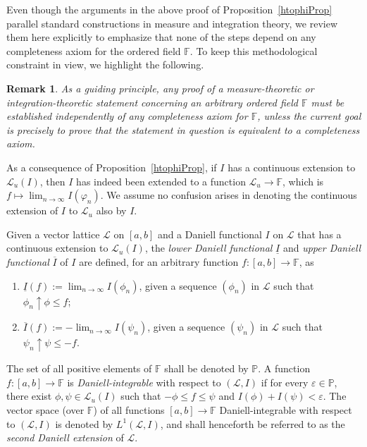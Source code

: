 \documentclass[11pt,a4paper]{article}
\newtheorem{remark}[theorem]{Remark}
\def\F{\mathbb{F}}
\def\P{\mathbb{P}}
\def\lbrak{\left[}
\def\rbrak{\right]}
\def\abClosed{\lbrak a,b\rbrak}
\def\stepLatt{\mathcal{L}}
\def\istepLatt{\stepLatt_u}
\def\into{\longrightarrow}
\def\nseqlim{{\displaystyle\lim_{n\rightarrow\infty}}}
\begin{document}
Even though the arguments in the above proof of Proposition~\ref{htophiProp} parallel standard constructions in measure and integration theory, we review them here explicitly to emphasize that none of the steps depend on any completeness axiom for the ordered field $\F$. To keep this methodological constraint in view, we highlight the following.

\begin{remark}\label{heuRem}
As a guiding principle, any proof of a measure-theoretic or integration-theoretic statement concerning an arbitrary ordered field $\F$ must be established independently of any completeness axiom for $\F$, unless the current goal is precisely to prove that the statement in question is equivalent to a completeness axiom.
\end{remark}

As a consequence of Proposition~\ref{htophiProp}, if $I$ has a continuous extension to $\istepLatt(I)$, then $I$ has indeed been extended to a function $\istepLatt\into\F$, which is $f\mapsto\nseqlim I(\varphi_n)$. We assume no confusion arises in denoting the continuous extension of $I$ to $\istepLatt$ also by $I$.


Given a vector lattice $\stepLatt$ on $\abClosed$ and a Daniell functional $I$ on $\stepLatt$ that has a continuous extension to $\istepLatt(I)$, the \emph{lower Daniell functional} $\underline{I}$ and \emph{upper Daniell functional} $\overline{I}$ of $I$ are defined, for an arbitrary function $f:\abClosed\into\F$, as
\begin{enumerate}
    \item $\underline{I}(f) := \nseqlim I(\phi_n)$, given a sequence $(\phi_n)$ in $\stepLatt$ such that $\phi_n \uparrow \phi \le f$;
    \item $\overline{I}(f) := -\nseqlim I(\psi_n)$, given a sequence $(\psi_n)$ in $\stepLatt$ such that $\psi_n \uparrow \psi \le -f$.
\end{enumerate}

The set of all positive elements of $\F$ shall be denoted by $\P$. A function $f:\abClosed\into\F$ is \emph{Daniell-integrable} with respect to $(\stepLatt,I)$ if for every $\varepsilon\in\P$, there exist $\phi,\psi\in \istepLatt(I)$ such that $-\phi \le f \le \psi$ and $I(\phi)+I(\psi)<\varepsilon$. The vector space (over $\F$) of all functions $\abClosed\into\F$ Daniell-integrable with respect to $(\stepLatt,I)$ is denoted by $L^1(\stepLatt,I)$, and shall henceforth be referred to as the \emph{second Daniell extension} of $\stepLatt$.
\end{document}
